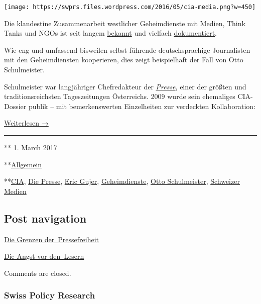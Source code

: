 \texttt{[image: https://swprs.files.wordpress.com/2016/05/cia-media.png?w=450]}

Die klandestine Zu­sam­men­arbeit west­licher Geheim­dienste mit Medien,
Think Tanks und NGOs ist seit langem
\href{http://carlbernstein.com/magazine_cia_and_media.php}{bekannt} und
vielfach
\href{http://www.amazon.de/Geheimdienst-Politik-Medien-Meinungsmache-Zeitgeschichte/dp/3897068796}{doku­men­tiert}.

Wie eng und um­fas­send bisweilen selbst füh­ren­de deutsch­spra­chige
Jour­na­listen mit den Ge­heim­diens­ten kooperieren, dies zeigt
bei­spiel­haft der Fall von Otto Schul­meister.

Schul­meister war lang­jäh­riger Chef­re­dak­teur der
\href{https://de.wikipedia.org/wiki/Die_Presse}{\emph{Presse}}, einer
der größ­ten und tra­di­tions­reich­sten Tages­­zeitungen Öster­reichs.
2009 wurde sein ehemaliges CIA-Dossier publik -- mit bemerkenswerten
Einzel­heiten zur ver­deckten Kol­la­bo­ration:

\href{https://swprs.org/der-chefredakteur-und-die-cia\#weiterlesen}{Weiterlesen
→}

\begin{center}\rule{0.5\linewidth}{\linethickness}\end{center}

** 1. March 2017

**\href{https://swprs.org/category/allgemein/}{Allgemein}

**\href{https://swprs.org/tag/cia/}{CIA},
\href{https://swprs.org/tag/die-presse/}{Die Presse},
\href{https://swprs.org/tag/eric-gujer/}{Eric Gujer},
\href{https://swprs.org/tag/geheimdienste/}{Geheimdienste},
\href{https://swprs.org/tag/otto-schulmeister/}{Otto Schulmeister},
\href{https://swprs.org/tag/schweizer-medien/}{Schweizer Medien}

\hypertarget{post-navigation}{%
\subsection{Post navigation}\label{post-navigation}}

\href{https://swprs.org/2017/03/01/die-grenzen-der-pressefreiheit/}{Die
Grenzen der~Pressefreiheit}

\href{https://swprs.org/2017/03/01/leserkommentare/}{Die Angst vor
den~Lesern}

Comments are closed.

\hypertarget{swiss-policy-research}{%
\subsubsection{Swiss Policy Research}\label{swiss-policy-research}}

